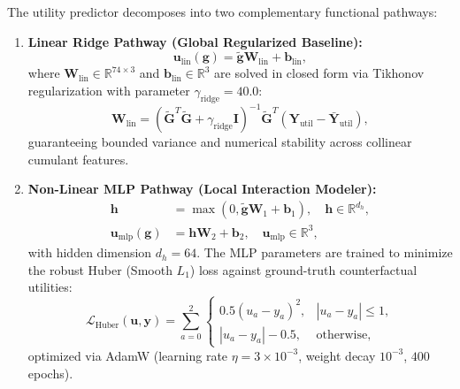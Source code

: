 The utility predictor decomposes into two complementary functional pathways:
\begin{enumerate}
    \item \textbf{Linear Ridge Pathway (Global Regularized Baseline):}
    \begin{equation}
        \mathbf{u}_{\mathrm{lin}}(\mathbf{g}) = \tilde{\mathbf{g}} \mathbf{W}_{\mathrm{lin}} + \mathbf{b}_{\mathrm{lin}},
        \label{eq:ridge_path}
    \end{equation}
    where $\mathbf{W}_{\mathrm{lin}} \in \mathbb{R}^{74 \times 3}$ and $\mathbf{b}_{\mathrm{lin}} \in \mathbb{R}^3$ are solved in closed form via Tikhonov regularization with parameter $\gamma_{\mathrm{ridge}} = 40.0$:
    \begin{equation}
        \mathbf{W}_{\mathrm{lin}} = (\tilde{\mathbf{G}}^T \tilde{\mathbf{G}} + \gamma_{\mathrm{ridge}} \mathbf{I})^{-1} \tilde{\mathbf{G}}^T (\mathbf{Y}_{\mathrm{util}} - \bar{\mathbf{Y}}_{\mathrm{util}}),
        \label{eq:ridge_closed_form}
    \end{equation}
    guaranteeing bounded variance and numerical stability across collinear cumulant features.
    
    \item \textbf{Non-Linear MLP Pathway (Local Interaction Modeler):}
    \begin{align}
        \mathbf{h} &= \max(0, \tilde{\mathbf{g}} \mathbf{W}_1 + \mathbf{b}_1), \quad \mathbf{h} \in \mathbb{R}^{d_h}, \label{eq:mlp_hidden} \\
        \mathbf{u}_{\mathrm{mlp}}(\mathbf{g}) &= \mathbf{h} \mathbf{W}_2 + \mathbf{b}_2, \quad \mathbf{u}_{\mathrm{mlp}} \in \mathbb{R}^3, \label{eq:mlp_output}
    \end{align}
    with hidden dimension $d_h = 64$. The MLP parameters are trained to minimize the robust Huber (Smooth $L_1$) loss against ground-truth counterfactual utilities:
    \begin{equation}
        \mathcal{L}_{\mathrm{Huber}}(\mathbf{u}, \mathbf{y}) = \sum_{a=0}^2 \begin{cases} 
            0.5 (u_a - y_a)^2, & |u_a - y_a| \le 1, \\
            |u_a - y_a| - 0.5, & \text{otherwise},
        \end{cases}
        \label{eq:huber_loss}
    \end{equation}
    optimized via AdamW (learning rate $\eta = 3\times 10^{-3}$, weight decay $10^{-3}$, $400$ epochs).
\end{enumerate}

